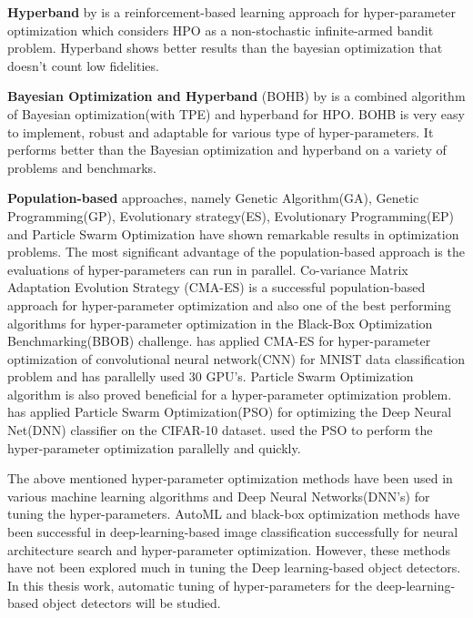 \documentclass[thesis]{mas_proposal}
\begin{document}
\textbf{Hyperband }by \citet{li2016hyperband} is a reinforcement-based learning approach for hyper-parameter optimization which considers HPO as a non-stochastic infinite-armed bandit problem. Hyperband shows better results than the bayesian optimization that doesn't count low fidelities.\cite{li2016hyperband}\cite{feurer_hyperparameter_2018}

\textbf{Bayesian Optimization and Hyperband} (BOHB) by \citet{falkner2018bohb}  is a combined algorithm of Bayesian optimization(with TPE) and hyperband for HPO.  BOHB is very easy to implement, robust and adaptable for various type of hyper-parameters.  It performs better than the Bayesian optimization and hyperband on a variety of problems and benchmarks. \cite{falkner2018bohb}\cite{feurer_hyperparameter_2018}

\textbf{Population-based} approaches, namely Genetic Algorithm(GA), Genetic Programming(GP), Evolutionary strategy(ES), Evolutionary Programming(EP) and Particle Swarm Optimization have shown remarkable results in optimization problems\cite{coello2007evolutionary}. The most significant advantage of the population-based approach is the evaluations of hyper-parameters can run in parallel.  Co-variance Matrix Adaptation Evolution Strategy (CMA-ES) is a successful population-based approach for hyper-parameter optimization\cite{loshchilov2016cma} and also one of the best performing algorithms for hyper-parameter optimization in the Black-Box Optimization Benchmarking(BBOB) challenge\cite{bbob}. \citet{loshchilov2016cma} has applied CMA-ES for hyper-parameter optimization of convolutional neural network(CNN) for MNIST data classification problem and has parallelly used 30 GPU's.  Particle Swarm Optimization algorithm is also proved beneficial for a hyper-parameter optimization problem. \citet{lorenzo2017particle} has applied Particle Swarm Optimization(PSO) for optimizing the Deep Neural Net(DNN) classifier on the CIFAR-10 dataset. \citet{lorenzo2017hyper} used the PSO to perform the hyper-parameter optimization parallelly and quickly. \cite{feurer_hyperparameter_2018}

The above mentioned hyper-parameter optimization methods have been used in various machine learning algorithms and Deep Neural Networks(DNN's) for tuning the hyper-parameters. AutoML and black-box optimization methods have been successful in deep-learning-based image classification successfully for neural architecture search and hyper-parameter optimization. However, these methods have not been explored much in tuning the Deep learning-based object detectors. In this thesis work, automatic tuning of hyper-parameters for the deep-learning-based object detectors will be studied. 
\end{document}
